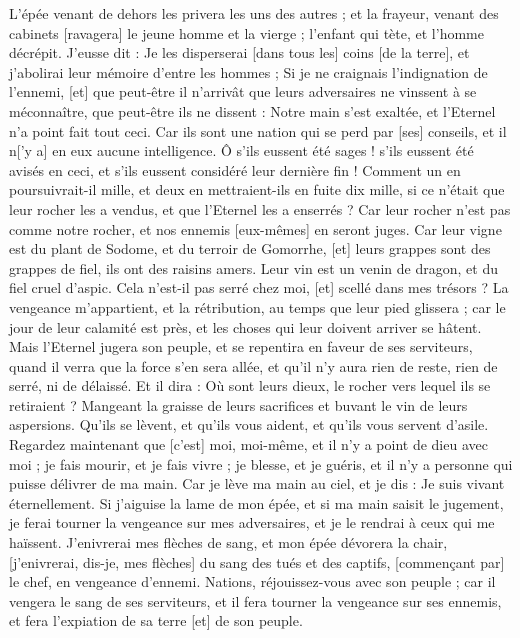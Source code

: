 \begin{multicols}{2}
L'épée venant de dehors les privera les uns des autres ; et la frayeur, venant des cabinets [ravagera] le jeune homme et la vierge ; l'enfant qui tète, et l'homme décrépit.
J'eusse dit : Je les disperserai [dans tous les] coins [de la terre], et j'abolirai leur mémoire d'entre les hommes ;
Si je ne craignais l'indignation de l'ennemi, [et] que peut-être il n'arrivât que leurs adversaires ne vinssent à se méconnaître, que peut-être ils ne dissent : Notre main s'est exaltée, et l'Eternel n'a point fait tout ceci.
Car ils sont une nation qui se perd par [ses] conseils, et il n['y a] en eux aucune intelligence.
Ô s'ils eussent été sages ! s'ils eussent été avisés en ceci, et s'ils eussent considéré leur dernière fin !
Comment un en poursuivrait-il mille, et deux en mettraient-ils en fuite dix mille, si ce n'était que leur rocher les a vendus, et que l'Eternel les a enserrés ?
Car leur rocher n'est pas comme notre rocher, et nos ennemis [eux-mêmes] en seront juges.
Car leur vigne est du plant de Sodome, et du terroir de Gomorrhe, [et] leurs grappes sont des grappes de fiel, ils ont des raisins amers.
Leur vin est un venin de dragon, et du fiel cruel d'aspic.
Cela n'est-il pas serré chez moi, [et] scellé dans mes trésors ?
La vengeance m'appartient, et la rétribution, au temps que leur pied glissera ; car le jour de leur calamité est près, et les choses qui leur doivent arriver se hâtent.
Mais l'Eternel jugera son peuple, et se repentira en faveur de ses serviteurs, quand il verra que la force s'en sera allée, et qu'il n'y aura rien de reste, rien de serré, ni de délaissé.
Et il dira : Où sont leurs dieux, le rocher vers lequel ils se retiraient ?
Mangeant la graisse de leurs sacrifices et buvant le vin de leurs aspersions. Qu'ils se lèvent, et qu'ils vous aident, et qu'ils vous servent d'asile.
Regardez maintenant que [c'est] moi, moi-même, et il n'y a point de dieu avec moi ; je fais mourir, et je fais vivre ; je blesse, et je guéris, et il n'y a personne qui puisse délivrer de ma main.
Car je lève ma main au ciel, et je dis : Je suis vivant éternellement.
Si j'aiguise la lame de mon épée, et si ma main saisit le jugement, je ferai tourner la vengeance sur mes adversaires, et je le rendrai à ceux qui me haïssent.
J'enivrerai mes flèches de sang, et mon épée dévorera la chair, [j'enivrerai, dis-je, mes flèches] du sang des tués et des captifs, [commençant par] le chef, en vengeance d'ennemi.
Nations, réjouissez-vous avec son peuple ; car il vengera le sang de ses serviteurs, et il fera tourner la vengeance sur ses ennemis, et fera l'expiation de sa terre [et] de son peuple.

\end{multicols}
